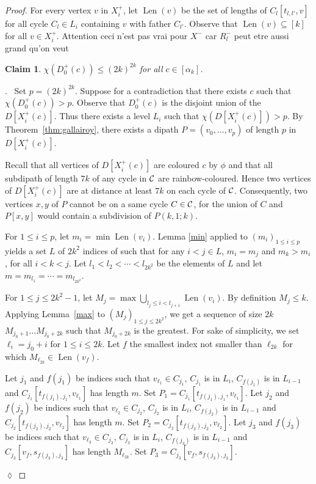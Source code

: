 \documentclass[utf8,10pt]{article}
\theoremstyle{plain}
\newtheorem{claim}{Claim}[theorem]
\theoremstyle{definition}
\theoremstyle{remark}
\newcommand{\FH}[1]{{\color{red}{\bf Fred:} #1}}
\newenvironment{subproof}{\par\noindent {\it Subproof}.\ }{\hfill$\lozenge$\par\vspace{11pt}}
\DeclareMathOperator{\Len}{Len}
\begin{document}
\begin{proof}
For every vertex $v$ in $X^+_i$, let $\Len(v)$ be the set of lengths of $C_l[t_{l,l'},v]$ for all cycle $C_l \in  L_i$ containing $v$ with father $C_{l'}$.
Observe that $\Len(v) \subseteq [k]$ for all $v\in X^+_i$.
\FH{Attention ceci n'est pas vrai pour $X^-$ car $R^-_l$ peut etre aussi grand qu'on veut}


\begin{claim}\label{claim:D0}
$\chi(D^+_0(c))\leq (2k)^{2k}$ for all $c\in [\alpha_k]$. 
\end{claim}
\begin{subproof}
Set $p=(2k)^{2k}$.
Suppose for a contradiction that there exists $c$ such that $\chi(D^+_0(c)) > p$. 
Observe that $D^+_0(c)$ is the disjoint union of the $D[X^+_i(c)]$. Thus there exists a level $L_i$ such that $\chi(D[X^+_i(c)]) >p$.
 By Theorem~\ref{thm:gallairoy}, there exists a dipath $P=(v_0,  \dots , v_{p})$ of length $p$ in $D[X^+_i(c)]$.

Recall that all vertices of $D[X^+_i(c)]$ are coloured $c$ by $\phi$ and that all subdipath of length $7k$ of any cycle in ${\cal C}$ are rainbow-coloured. Hence two vertices of  $D[X^+_i(c)]$ are at distance at least $7k$ on each cycle of ${\cal C}$.
Consequently, two vertices $x,y$ of $P$ cannot be on a same cycle $C\in {\cal C}$, for the union of $C$ and $P[x,y]$ would contain a subdivision of
$P(k,1;k)$. 






For $1\leq i\leq p$, let $m_i = \min \Len(v_i)$. 
Lemma \ref{min} applied to $(m_i)_{1\leq i\leq p}$ yields a set $L$ of $2k^2$ indices of such that 
for any $i< j \in L$,  $m_i=m_j$ and $m_k > m_i$, for all $i< k < j$.
Let $l_1 < l_2 < \cdots < l_{2k^2}$ be the elements of $L$ and let $m= m_{l_1} = \cdots = m_{l_{2k^2}}$.


For $1\leq j\leq 2k^2-1$, let $M_j = \max \bigcup_{l_j\leq i < l_{j+1}} \Len(v_i)$.
By definition $M_j\leq k$.
Applying Lemma~\ref{max} to $(M_j)_{1\leq j\leq 2k^2}$,  we get a sequence of size $2k$ $M_{j_0+1} \dots M_{j_0+{2k}}$ such that $M_{j_0+{2k}}$ is the greatest. 
For sake of simplicity, we set $\ell_i =j_0+i$ for $1\leq i\leq 2k$.
Let $f$ the smallest index not smaller than $\ell_{2k}$ for which $M_{\ell_{2k}} \in \Len (v_f)$. 

Let $j_1$ and $f(j_1)$ be indices such that $v_{\ell_1} \in C_{j_1}$, $C_{j_1}$ is in $L_i$, $C_{f(j_1)}$ is in $L_{i-1}$ and 
$C_{j_1}[t_{f(j_1),j_1},v_{\ell_1}]$ has length $m$. Set $P_1=C_{j_1}[t_{f(j_1),j_1},v_{\ell_1}]$.
Let $j_2$ and $f(j_2)$ be indices such that $v_{\ell_2} \in C_{j_2}$, $C_{j_2}$ is in $L_i$, $C_{f(j_2)}$ is in $L_{i-1}$ and 
$C_{j_2}[t_{f(j_2),j_2},v_{\ell_2}]$ has length $m$. Set $P_2=C_{j_2}[t_{f(j_2),j_2},v_{\ell_2}]$.
Let $j_3$ and $f(j_3)$ be indices such that $v_{\ell_3} \in C_{j_3}$, $C_{j_3}$ is in $L_i$, $C_{f(j_3)}$ is in $L_{i-1}$ and 
$C_{j_3}[v_{f},s_{f(j_3),j_3}]$ has length $M_{\ell_{2k}}$. Set $P_3=C_{j_3}[v_{f},s_{f(j_3),j_3}]$.


\end{subproof}
\end{proof}
\end{document}
